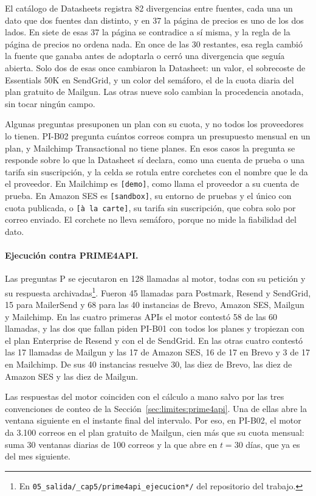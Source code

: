 El catálogo de Datasheets registra 82 divergencias entre fuentes, cada una un dato que dos fuentes dan distinto, y en 37 la página de precios es uno de los dos lados.
En siete de esas 37 la página se contradice a sí misma, y la regla de la página de precios no ordena nada.
En once de las 30 restantes, esa regla cambió la fuente que ganaba antes de adoptarla o cerró una divergencia que seguía abierta.
Solo dos de esas once cambiaron la Datasheet: un valor, el sobrecoste de Essentials 50K en SendGrid, y un color del semáforo, el de la cuota diaria del plan gratuito de Mailgun.
Las otras nueve solo cambian la procedencia anotada, sin tocar ningún campo.

Algunas preguntas presuponen un plan con su cuota, y no todos los proveedores lo tienen.
PI-B02 pregunta cuántos correos compra un presupuesto mensual en un plan, y Mailchimp Transactional no tiene planes.
En esos casos la pregunta se responde sobre lo que la Datasheet sí declara, como una cuenta de prueba o una tarifa sin suscripción, y la celda se rotula entre corchetes con el nombre que le da el proveedor.
En Mailchimp es \texttt{[demo]}, como llama el proveedor a su cuenta de prueba.
En Amazon SES es \texttt{[sandbox]}, su entorno de pruebas y el único con cuota publicada, o \texttt{[à la carte]}, su tarifa sin suscripción, que cobra solo por correo enviado.
El corchete no lleva semáforo, porque no mide la fiabilidad del dato.

\paragraph{Ejecución contra PRIME4API.}
Las preguntas P se ejecutaron en 128 llamadas al motor, todas con su petición y su respuesta archivadas\footnote{En \texttt{05\_salida/\allowbreak \_cap5/\allowbreak prime4api\_ejecucion*/} del repositorio del trabajo.}.
Fueron 45 llamadas para Postmark, Resend y SendGrid, 15 para MailerSend y 68 para las 40 instancias de Brevo, Amazon SES, Mailgun y Mailchimp.
En las cuatro primeras APIs el motor contestó 58 de las 60 llamadas, y las dos que fallan piden PI-B01 con todos los planes y tropiezan con el plan Enterprise de Resend y con el de SendGrid.
En las otras cuatro contestó las 17 llamadas de Mailgun y las 17 de Amazon SES, 16 de 17 en Brevo y 3 de 17 en Mailchimp.
De sus 40 instancias resuelve 30, las diez de Brevo, las diez de Amazon SES y las diez de Mailgun.

Las respuestas del motor coinciden con el cálculo a mano salvo por las tres convenciones de conteo de la Sección~\ref{sec:limites:prime4api}.
Una de ellas abre la ventana siguiente en el instante final del intervalo.
Por eso, en PI-B02, el motor da 3.100 correos en el plan gratuito de Mailgun, cien más que su cuota mensual: suma 30 ventanas diarias de 100 correos y la que abre en $t = 30$ días, que ya es del mes siguiente.

